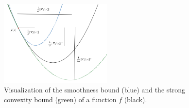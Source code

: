 \begin{figure}[h!] \label{parabolas}
\centering
        \includegraphics[width=0.5\textwidth]{img/parabolas} 
        \caption{Visualization of the smoothness bound (blue) and the strong convexity bound (green) of a function $f$ (black). }
\end{figure}

